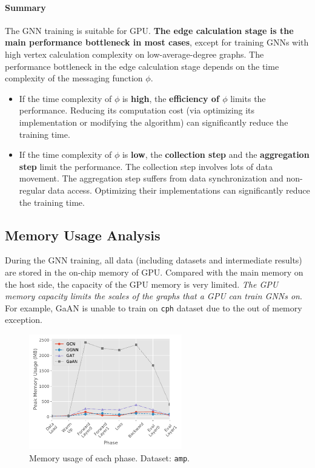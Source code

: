 \paragraph{Summary}
The GNN training is suitable for GPU.
\textbf{The edge calculation stage is the main performance bottleneck in most cases}, except for training GNNs with high vertex calculation complexity on low-average-degree graphs.
The performance bottleneck in the edge calculation stage depends on the time complexity of the messaging function $\phi$.
\begin{itemize}
    \item If the time complexity of $\phi$ is \textbf{high}, the \textbf{efficiency of $\phi$} limits the performance. Reducing its computation cost (via optimizing its implementation or modifying the algorithm) can significantly reduce the training time.
    \item If the time complexity of $\phi$ is \textbf{low}, the \textbf{collection step} and the \textbf{aggregation step} limit the performance. The collection step involves lots of data movement. The aggregation step suffers from data synchronization and non-regular data access. Optimizing their implementations can significantly reduce the training time.
\end{itemize}

\subsection{Memory Usage Analysis}
\label{sec:memory_usage_analysis}

During the GNN training, all data (including datasets and intermediate results) are stored in the on-chip memory of GPU.
Compared with the main memory on the host side, the capacity of the GPU memory is very limited.
\emph{The GPU memory capacity limits the scales of the graphs that a GPU can train GNNs on}.
For example, GaAN is unable to train on \texttt{cph} dataset due to the out of memory exception.

\begin{figure}
    \centering
    \includegraphics[height=5cm]{figs/experiments/exp_memory_usage_stage_amp.pdf}
    \caption{Memory usage of each phase. Dataset: \texttt{amp}.}
    \label{fig:exp_memory_usage_stage_amp}
\end{figure}

